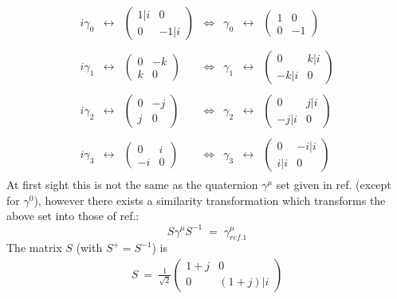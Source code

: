 \begin{eqnarray}
\begin{array}{ccccccc}
i \gamma_{0} & \leftrightarrow & \left( \begin{array}{cc} 1\vert i & 0\\
0 & -1\vert i \end{array} \right) & \Longleftrightarrow & \gamma_{0}
& \leftrightarrow & \left( \begin{array}{cc} 1 & 0\\
0 & -1 \end{array} \right)\\ \\
i \gamma_{1} & \leftrightarrow & \left( \begin{array}{cc} 0 & -k\\
k & 0 \end{array} \right) & \Longleftrightarrow & \gamma_{1}
& \leftrightarrow & \left( \begin{array}{cc} 0 & k\vert i\\
-k\vert i & 0 \end{array} \right)\\ \\
i \gamma_{2} & \leftrightarrow & \left( \begin{array}{cc} 0 & -j\\
j & 0 \end{array} \right) & \Longleftrightarrow & \gamma_{2}
& \leftrightarrow & \left( \begin{array}{cc} 0 & j\vert i\\
-j\vert i & 0 \end{array} \right)\\ \\
i \gamma_{3} & \leftrightarrow & \left( \begin{array}{cc} 0 & i\\
-i & 0 \end{array} \right) & \Longleftrightarrow & \gamma_{3}
& \leftrightarrow & \left( \begin{array}{cc} 0 & -i\vert i\\
i\vert i  & 0 \end{array} \right)
\end{array}
\end{eqnarray}
At first sight this is not the same as the quaternion $\gamma^{\mu}$
set given in ref.\cite{rot1} (except for $\gamma^{0}$), however there exists a
similarity transformation which transforms the above set into those of
ref.\cite{rot1}:
\begin{equation}
S\gamma^{\mu}S^{-1} \; = \; \gamma^{\mu}_{ref.1}
\end{equation}
The matrix $S$ (with $S^{+} = S^{-1}$) is
\begin{eqnarray}
S \: = \: \frac{1}{\sqrt{2}} \left( \begin{array}{cc} 1+j & 0\\
0 & (1+j)\vert i \end{array} \right)
\end{eqnarray}

